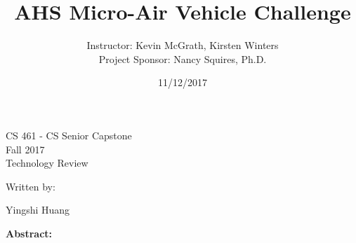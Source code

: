 \documentclass[letterpaper, 10, draftclsnofoot, onecolumn, compsoc]{IEEEtran}
\date{11/12/2017}
\title{AHS Micro-Air Vehicle Challenge}
\author{ Instructor: Kevin McGrath, Kirsten Winters \\
    Project Sponsor: Nancy Squires, Ph.D.}
\def\class{CS 461 - CS Senior Capstone}
\def\term{Fall 2017}
\begin{document}
\null  %
\nointerlineskip  %
\vfill
\let\snewpage \newpage
\let\newpage \relax
\maketitle
\begin{center}
\class\\
\term\\
\huge{Technology Review}\par
\vspace{2mm}
\large{Written by:}\par
\normalsize{Yingshi Huang}\par
\vspace{8mm}


\large{\textbf{Abstract:}}\par
\vspace{2mm}
\end{center}
\par
\end{document}

